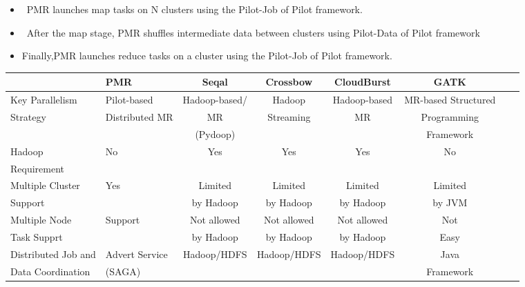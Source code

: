 \documentclass{acm_proc_article-sp}
\begin{document}
\begin{itemize}
\item{~PMR launches map tasks on N clusters using the Pilot-Job of Pilot framework.}
\item{~After the map stage, PMR shuffles intermediate data between clusters using Pilot-Data of Pilot framework} 
\item{Finally,PMR launches reduce tasks on a cluster using the Pilot-Job of Pilot framework.}
\end{itemize}

\begin{center}
\begin{table}[ht]
{\small
\hfill{}
\begin{tabular}{|l|l|c|c|c|c|c|c|}
\hline
  &\centering \textbf{PMR}\cite{pmr2012} & \textbf{Seqal}\cite{seal2011} & \textbf{Crossbow}\cite{langmead2009} & \textbf{CloudBurst}\cite{cloudburst} & \textbf{GATK}\cite{gatk} \\ \hline
 \hline 
 Key Parallelism   & Pilot-based   &  Hadoop-based/  &  Hadoop   & Hadoop-based & MR-based Structured \\ 
Strategy  & Distributed MR & MR  & Streaming  & MR & Programming  \\
& & (Pydoop) &  & & Framework \\ \hline
  
Hadoop & No & Yes & Yes\footnote[1] & Yes & No \\ 
Requirement  & & & &  &\\ \hline  
    
Multiple  Cluster & Yes  & Limited   & Limited  & Limited  & Limited \\
Support &  & by Hadoop &  by Hadoop & by Hadoop  & by JVM   \\ \hline

Multiple Node & Support & Not allowed  & Not allowed  & Not allowed & Not  \\
Task Supprt &  & by Hadoop & by Hadoop & by Hadoop & Easy  \\ \hline
Distributed Job and  & Advert Service  & Hadoop/HDFS & Hadoop/HDFS & Hadoop/HDFS & Java \\ 
Data Coordination &(SAGA) &  & & & Framework\\ \hline



\end{tabular}}
\end{table}
\end{center}
\end{document}
